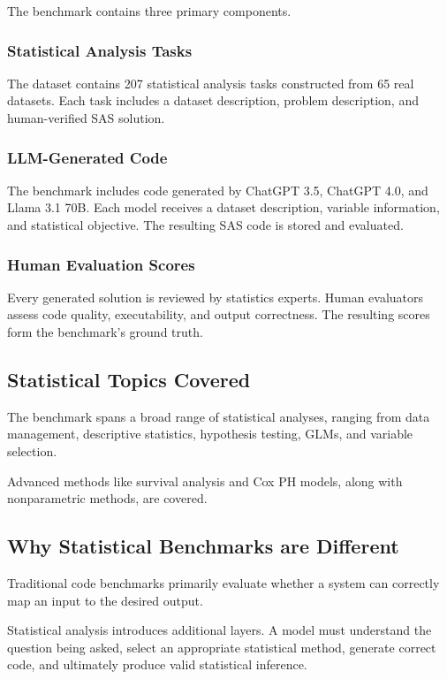 \documentclass[11pt]{article}
\begin{document}
The benchmark contains three primary components.

\subsubsection*{Statistical Analysis Tasks}

The dataset contains 207 statistical analysis tasks constructed from 65 real datasets. Each task includes a dataset description, problem description, and human-verified SAS solution.

\subsubsection*{LLM-Generated Code}

The benchmark includes code generated by ChatGPT 3.5, ChatGPT 4.0, and Llama 3.1 70B. Each model receives a dataset description, variable information, and statistical objective.
The resulting SAS code is stored and evaluated.

\subsubsection*{Human Evaluation Scores}

Every generated solution is reviewed by statistics experts. Human evaluators assess code quality, executability, and output correctness. The resulting scores form the benchmark's ground truth.

\subsection*{Statistical Topics Covered}

The benchmark spans a broad range of statistical analyses, ranging from data management, descriptive statistics, hypothesis testing, GLMs, and variable selection.

Advanced methods like survival analysis and Cox PH models, along with nonparametric methods, are covered.

\subsection*{Why Statistical Benchmarks are Different}

Traditional code benchmarks primarily evaluate whether a system can correctly map an input to the desired output.

Statistical analysis introduces additional layers. A model must understand the question being asked, select an appropriate statistical method, generate correct code, and ultimately produce valid statistical inference.
\end{document}

